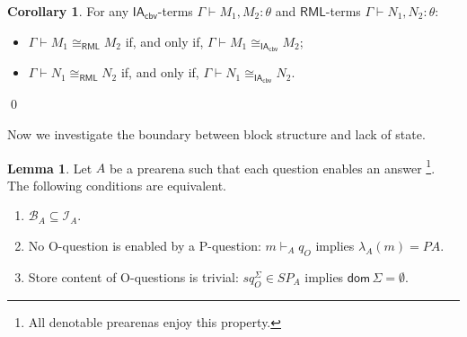 \documentclass{CSML}
\theoremstyle{definition}\newtheorem{definition}[thm]{Definition}
\theoremstyle{definition}\newtheorem{example}[thm]{Example}
\theoremstyle{definition}\newtheorem{proposition}[thm]{Proposition}
\theoremstyle{definition}\newtheorem{lemma}[thm]{Lemma}
\theoremstyle{definition}\newtheorem{theorem}[thm]{Theorem}
\theoremstyle{definition}\newtheorem{corollary}[thm]{Corollary}
\theoremstyle{definition}\newtheorem{remark}[thm]{Remark}
\newcommand\nt[1]{#1}
\renewcommand\Sigma{\varSigma}
\newcommand\Splays[1]{\mathit{SP}_{#1}}
\newcommand\dom[1]{\mathsf{dom}\,#1}
\newcommand\eqmod[1]{\cong_{#1}}
\newcommand\iacbv{\mathsf{IA}_{\mathsf{cbv}}}
\newcommand\rml{\mathsf{RML}}
\newcommand\seq[2]{{#1} \vdash {#2}}
\newcommand\binno[1]{\mathcal{B}_{#1}}
\newcommand\inno[1]{\mathcal{I}_{#1}}
\begin{document}
\begin{corollary}\label{cor:conservativity}
For any $\iacbv$-terms $\seq{\Gamma}{M_1,M_2}:\theta$ and $\rml$-terms $\seq{\Gamma}{N_1,N_2}:\theta$:
\begin{itemize}
\item $\seq{\Gamma}{M_1\eqmod{\rml}M_2}$
if, and only if, $\seq{\Gamma}{M_1\eqmod{\iacbv}M_2}$;
\item $\seq{\Gamma}{N_1\eqmod{\rml}N_2}$
if, and only if, $\seq{\Gamma}{N_1\eqmod{\iacbv}N_2}$.
\end{itemize}\qed
\end{corollary}
Now we investigate the boundary between block structure
and lack of state.
\begin{lemma}\label{lem:binno-inno}
Let $A$ be a \nt{prearena} such that each question enables an answer
\footnote{All denotable \nt{prearenas} enjoy this property.}.
The following conditions are equivalent.
\begin{enumerate}
\item $\binno{A}\subseteq\inno{A}$.
\item No O-question is enabled by a P-question:
$m\vdash_A q_O$ implies $\lambda_A(m)=PA$.
\item Store content of O-questions is trivial:
$s q_O^\Sigma\in\Splays{A}$ implies $\dom{\Sigma}=\emptyset$.
\end{enumerate}
\end{lemma}
\end{document}
